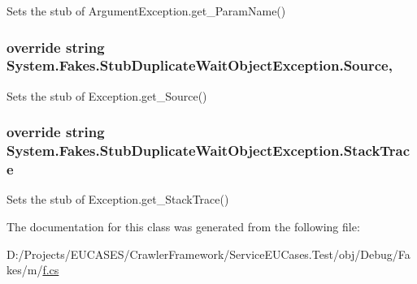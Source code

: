 Sets the stub of Argument\-Exception.\-get\-\_\-\-Param\-Name()

\hypertarget{class_system_1_1_fakes_1_1_stub_duplicate_wait_object_exception_af3020aa0560985e0bae5f55da5e9101d}{
\subsubsection[{Source}]{\setlength{\rightskip}{0pt plus 5cm}override string System.\-Fakes.\-Stub\-Duplicate\-Wait\-Object\-Exception.\-Source\hspace{0.3cm}{\ttfamily [get]}, {\ttfamily [set]}}}\label{class_system_1_1_fakes_1_1_stub_duplicate_wait_object_exception_af3020aa0560985e0bae5f55da5e9101d}


Sets the stub of Exception.\-get\-\_\-\-Source()

\hypertarget{class_system_1_1_fakes_1_1_stub_duplicate_wait_object_exception_abc327a1aa772589f13fa76a13f80d037}{
\subsubsection[{Stack\-Trace}]{\setlength{\rightskip}{0pt plus 5cm}override string System.\-Fakes.\-Stub\-Duplicate\-Wait\-Object\-Exception.\-Stack\-Trace\hspace{0.3cm}{\ttfamily [get]}}}\label{class_system_1_1_fakes_1_1_stub_duplicate_wait_object_exception_abc327a1aa772589f13fa76a13f80d037}


Sets the stub of Exception.\-get\-\_\-\-Stack\-Trace()



The documentation for this class was generated from the following file\-:\begin{DoxyCompactItemize}
\item 
D\-:/\-Projects/\-E\-U\-C\-A\-S\-E\-S/\-Crawler\-Framework/\-Service\-E\-U\-Cases.\-Test/obj/\-Debug/\-Fakes/m/\hyperlink{m_2f_8cs}{f.\-cs}\end{DoxyCompactItemize}
